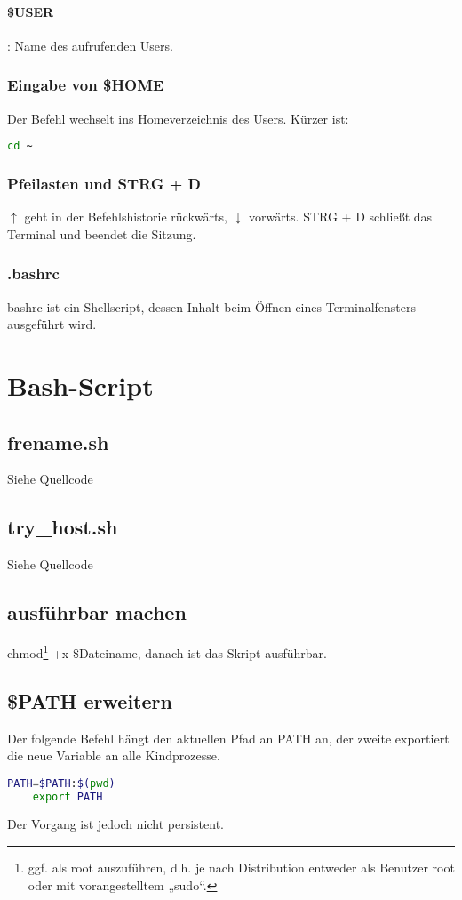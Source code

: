 \documentclass[]{scrartcl}
\begin{document}
\paragraph{\$USER}: Name des aufrufenden Users.

\subsubsection*{Eingabe von \$HOME}
Der Befehl wechselt ins Homeverzeichnis des Users. Kürzer ist:
\begin{lstlisting}[language=bash]
	cd ~
\end{lstlisting}

\subsubsection*{Pfeilasten und STRG + D}
$\uparrow$ geht in der Befehlshistorie rückwärts, $\downarrow$ vorwärts. STRG + D schließt das Terminal und beendet die Sitzung.

\subsubsection*{.bashrc}
bashrc ist ein Shellscript, dessen Inhalt beim Öffnen eines Terminalfensters ausgeführt wird.

\section{Bash-Script}
\subsection{frename.sh}
Siehe Quellcode

\subsection{try\_host.sh}
Siehe Quellcode

\subsection{ausführbar machen}
chmod\footnote{ggf. als root auszuführen, d.h. je nach Distribution entweder als Benutzer root oder mit vorangestelltem „sudo“.} +x \$Dateiname, danach ist das Skript ausführbar.

\subsection{\$PATH erweitern}
Der folgende Befehl hängt den aktuellen Pfad an PATH an, der zweite exportiert die neue Variable an alle Kindprozesse.
\begin{lstlisting}[language=bash]
	PATH=$PATH:$(pwd)
	export PATH
\end{lstlisting}
Der Vorgang ist jedoch nicht persistent.
\end{document}
